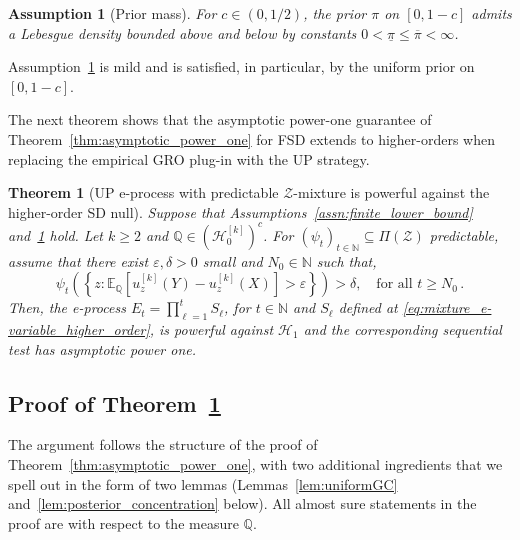 \documentclass[12pt,twoside]{article}
\theoremstyle{plain}
\newtheorem{theorem}{Theorem}
\newtheorem{assumption}{Assumption}
\theoremstyle{definition}
\theoremstyle{remark}
\newcommand{\N}{\mathbb{N}}
\newcommand{\calH}{\mathcal{H}}
\newcommand{\calZ}{\mathcal{Z}}
\newcommand{\Esymb}{\mathbb{E}}
\newcommand{\Qsymb}{\mathbb{Q}}
\newcommand{\Ex}[2]{\Esymb_{{#1}}\left[{#2}\right]}
\renewcommand{\epsilon}{\varepsilon}
\begin{document}
\begin{assumption}[Prior mass]\label{ass:prior}
For $c\in(0,1/2)$, the prior $\pi$ on $[0,1-c]$ admits a Lebesgue density
bounded above and below by constants $0<\underline\pi\le\overline\pi<\infty$.
\end{assumption}


Assumption~\ref{ass:prior} is mild and is satisfied, in particular, by the uniform prior on $[0,1-c]$.

The next theorem shows that the asymptotic power-one guarantee of Theorem~\ref{thm:asymptotic_power_one} for FSD extends to higher-orders when replacing the empirical GRO plug-in with the UP strategy.  

\begin{theorem}[UP e-process with predictable $\calZ$-mixture is powerful against the higher-order SD null]\label{thm:asymptotic_power_one_for_higher_order} Suppose that Assumptions~\ref{assn:finite_lower_bound} and~\ref{ass:prior} hold. 
Let $k\geq 2$ and $\Qsymb\in (\calH_0^{[k]})^c$. For $(\psi_t)_{t\in \N}\subseteq \Pi(\calZ)$ predictable, assume that there exist $\epsilon,\delta>0$ small and $N_0 \in \N$ such that, 
\begin{equation*}
\psi_t\left(\left\{z:\Ex{\Qsymb}{{u}_z^{[k]}(Y)-{u}_z^{[k]}(X)}> \epsilon\right\}\right)>\delta, \quad \textrm{for all }t\geq N_0\,.
\end{equation*} 
Then, the e-process $E_t=\prod_{\ell=1}^t S_\ell$, for $t\in \N$ and $S_\ell$ defined at \eqref{eq:mixture_e-variable_higher_order}, is powerful against $\calH_1$ and the corresponding sequential test has asymptotic power one. 
\end{theorem}







\subsection{Proof of Theorem~\ref{thm:asymptotic_power_one_for_higher_order}}\label{seq:proofs_higher_order_SD}
The argument follows the structure of the proof of
Theorem~\ref{thm:asymptotic_power_one}, with two additional ingredients that we spell out
in the form of two lemmas (Lemmas~\ref{lem:uniformGC}
and~\ref{lem:posterior_concentration} below). All almost sure statements in the proof are with respect to the measure $\Qsymb$. 
\end{document}
